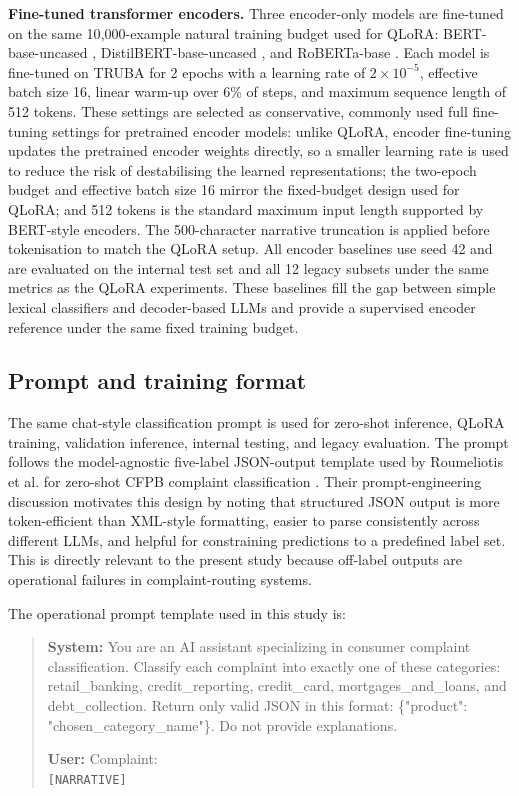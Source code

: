 \documentclass{elektr}
\begin{document}
\textbf{Fine-tuned transformer encoders.} Three encoder-only models are fine-tuned on the same 10{,}000-example natural training budget used for QLoRA: BERT-base-uncased \cite{devlin2019bert}, DistilBERT-base-uncased \cite{sanh2019distilbert}, and RoBERTa-base \cite{liu2019roberta}. Each model is fine-tuned on TRUBA for 2 epochs with a learning rate of $2\times10^{-5}$, effective batch size 16, linear warm-up over 6\% of steps, and maximum sequence length of 512 tokens. These settings are selected as conservative, commonly used full fine-tuning settings for pretrained encoder models: unlike QLoRA, encoder fine-tuning updates the pretrained encoder weights directly, so a smaller learning rate is used to reduce the risk of destabilising the learned representations; the two-epoch budget and effective batch size 16 mirror the fixed-budget design used for QLoRA; and 512 tokens is the standard maximum input length supported by BERT-style encoders. The 500-character narrative truncation is applied before tokenisation to match the QLoRA setup. All encoder baselines use seed 42 and are evaluated on the internal test set and all 12 legacy subsets under the same metrics as the QLoRA experiments. These baselines fill the gap between simple lexical classifiers and decoder-based LLMs and provide a supervised encoder reference under the same fixed training budget.

\subsection{Prompt and training format}

The same chat-style classification prompt is used for zero-shot inference, QLoRA training, validation inference, internal testing, and legacy evaluation. The prompt follows the model-agnostic five-label JSON-output template used by Roumeliotis et al. for zero-shot CFPB complaint classification \cite{roumeliotis2025think}. Their prompt-engineering discussion motivates this design by noting that structured JSON output is more token-efficient than XML-style formatting, easier to parse consistently across different LLMs, and helpful for constraining predictions to a predefined label set. This is directly relevant to the present study because off-label outputs are operational failures in complaint-routing systems.

The operational prompt template used in this study is:

\begin{quote}
\small
\noindent \textbf{System:} You are an AI assistant specializing in consumer complaint classification. Classify each complaint into exactly one of these categories:
retail\_banking, credit\_reporting, credit\_card, mortgages\_and\_loans, and debt\_collection. Return only valid JSON in this format:
\{"product": "chosen\_category\_name"\}. Do not provide explanations.

\medskip
\noindent \textbf{User:} Complaint:\\
\texttt{[NARRATIVE]}
\end{quote}
\end{document}
